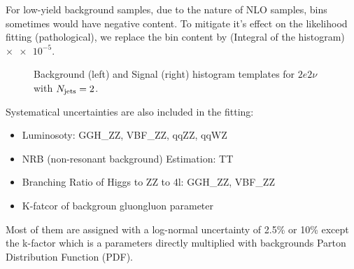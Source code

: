 For low-yield background samples, due to the nature of NLO samples, bins sometimes would have negative
content. To mitigate it's effect on the likelihood fitting (pathological), we replace the bin content
by (Integral of the histogram) $\times \num{e-5}$.
\begin{figure}[htb]
    \begin{center}
    \end{center}
    \caption{Background (left) and Signal (right) histogram templates for $2e2\nu$ with $N_\mathrm{jets} = 2$.}
    \label{fig:templates_demo}
\end{figure}

Systematical uncertainties are also included in the fitting:
\begin{itemize}
    \item Luminosoty: GGH\_ZZ, VBF\_ZZ, qqZZ, qqWZ
    \item NRB (non-resonant background) Estimation: TT
    \item Branching Ratio of Higgs to ZZ to 4l: GGH\_ZZ, VBF\_ZZ
    \item K-fatcor of backgroun gluongluon parameter
\end{itemize}
Most of them are assigned with a log-normal uncertainty of 2.5\% or 10\% except the k-factor
which is a parameters directly multiplied with backgrounds Parton Distribution Function (PDF).
